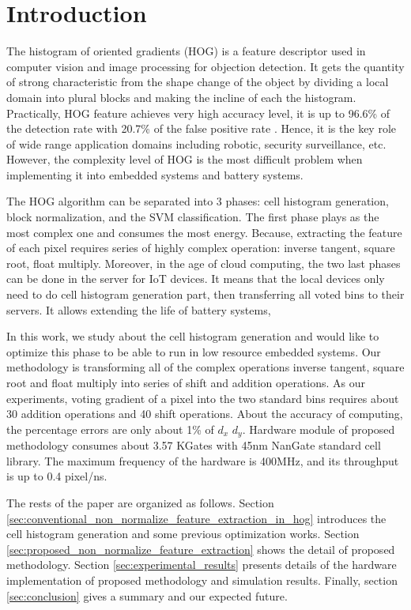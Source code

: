 %
%

\section{Introduction}
\label{sec:introduction}
The histogram of oriented gradients (HOG) \cite{dalal2005hog} is a feature descriptor used in
computer vision and image processing for objection detection.
It gets the quantity of strong characteristic from the shape change of the object by
dividing a local domain into plural blocks and making the incline of each the
histogram.
Practically, HOG feature achieves very high accuracy level,  it is up to
96.6\% of the detection rate with 20.7\% of the false positive rate
\cite{negi2011dpo}.
Hence, it is the key role of wide  range application domains including robotic,
security surveillance, etc.
However,  the complexity level of HOG is the most difficult problem when
implementing it into embedded systems and  battery systems.


The HOG algorithm can be separated into 3 phases: cell histogram generation,
block normalization, and the SVM classification.
The first phase plays as the most complex one and consumes the most energy.
Because, extracting the feature of each pixel requires series of highly complex
operation: inverse tangent, square root, float multiply.
Moreover, in the age of cloud computing, the two last phases can be done in the
server  for IoT devices.
It means that the local devices only need to do cell histogram generation part,
then transferring all voted bins to their servers.
It allows extending the life of battery systems,

In this work, we study about the cell histogram generation and would like to optimize this
phase to be able to run in low resource embedded systems.
Our methodology  is transforming all of the complex operations inverse tangent, square root
and float multiply  into series of shift and addition operations.
As our experiments, voting gradient of a pixel into the two standard bins  requires about 30 addition operations
and 40 shift operations.
About the accuracy of computing, the percentage errors are only about 1\% of
$d_x$ $d_y$.
Hardware module of proposed methodology consumes about 3.57 KGates with 45nm
NanGate standard cell library.
The maximum frequency of the hardware is 400MHz, and its throughput is up to 0.4 pixel/ns.


The rests of the paper are organized as follows.
Section \ref{sec:conventional_non_normalize_feature_extraction_in_hog}
introduces the cell histogram generation and some previous optimization works.
Section \ref{sec:proposed_non_normalize_feature_extraction} shows the detail of
proposed methodology.
Section \ref{sec:experimental_results} presents details of the hardware
implementation of proposed methodology and simulation results.
Finally, section \ref{sec:conclusion} gives a summary and our expected
future.
